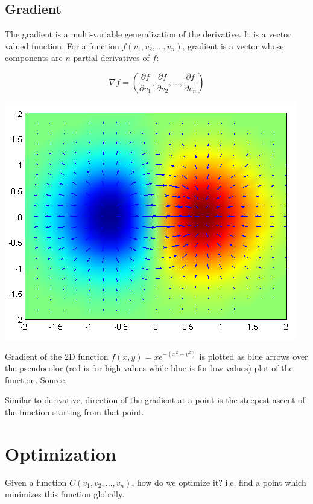 \documentclass[a4paper]{tufte-handout}
\begin{document}
\subsection{Gradient}\label{gradient}

The gradient is a multi-variable generalization of the derivative. It is
a vector valued function. For a function \(f(v_1, v_2, \ldots, v_n)\),
gradient is a vector whose components are \(n\) partial derivatives of
\(f\):

\[ \nabla f = (\frac{\partial f}{\partial v_1 }, \frac{\partial f}{\partial v_2 }, \ldots, \frac{\partial f}{\partial v_n })\]


\begin{marginfigure}
  \includegraphics[width=\linewidth]{gradient.png}
  \caption{Gradient of the 2D function \(f(x, y) = xe^{−(x^2 + y^2)}\) is
plotted as blue arrows over the pseudocolor (red is for high values
while blue is for low values) plot of the function.
\href{https://en.wikipedia.org/wiki/Gradient}{Source}.}
\end{marginfigure}


Similar to derivative, direction of the gradient at a point is the
steepest ascent of the function starting from that point.

\section{Optimization}\label{optimization}

Given a function \(C(v_1, v_2, \ldots, v_n)\), how do we optimize it?
i.e, find a point which minimizes this function globally.
\end{document}

